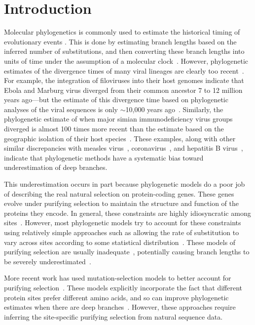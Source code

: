 \documentclass[11pt]{article}
\begin{document}
\section*{Introduction} 
Molecular phylogenetics is commonly used to estimate the historical timing of evolutionary events \citep{yang2012molecular}.
This is done by estimating branch lengths based on the inferred number of substitutions, and then converting these branch lengths into units of time under the assumption of a molecular clock~\citep{zuckerkandl1965,drummond2006relaxed}.
However, phylogenetic estimates of the divergence times of many viral lineages are clearly too recent~\citep{duchene2014analyses, ho2015time, aiewsakun2016time}.
For example, the integration of filoviruses into their host genomes indicate that Ebola and Marburg virus diverged from their common ancestor 7 to 12 million years ago---but the estimate of this divergence time based on phylogenetic analyses of the viral sequences is only $\sim$10,000 years ago~\citep{carroll2013molecular, taylor2014evidence}. 
Similarly, the phylogenetic estimate of when major simian immunodeficiency virus groups diverged is almost 100 times more recent than the estimate based on the geographic isolation of their host species~\citep{wertheim2009dating, worobey2010island}. 
These examples, along with other similar discrepancies with measles virus~\citep{furuse2010origin}, coronavirus~\citep{wertheim2013case}, and hepatitis B virus~\citep{fares2002revised, holmes2003molecular}, indicate that phylogenetic methods have a systematic bias toward underestimation of deep branches.

This underestimation occurs in part because phylogenetic models do a poor job of describing the real natural selection on protein-coding genes. 
These genes evolve under purifying selection to maintain the structure and function of the proteins they encode. 
In general, these constraints are highly idiosyncratic among sites~\citep{echave2016causes}.
However, most phylogenetic models try to account for these constraints using relatively simple approaches such as allowing the rate of substitution to vary across sites according to some statistical distribution~\citep{yang1994maximum,yang2000codon}.
These models of purifying selection are usually inadequate~\citep{duchene2015substitution, duchene2015evaluating}, potentially causing branch lengths to be severely underestimated~\citep{wertheim2011purifying, halpern1998evolutionary}.

More recent work has used mutation-selection models to better account for purifying selection~\citep{halpern1998evolutionary,yang2008mutation,rodrigue2010mutation,tamuri2012estimating,mccandlish2014modeling}.
These models explicitly incorporate the fact that different protein sites prefer different amino acids, and so can improve phylogenetic estimates when there are deep branches~\citep{philippe1998good, lartillot2007suppression, le2008phylogenetic, si2008empirical, wang2008class}.
However, these approaches require inferring the site-specific purifying selection from natural sequence data.
\end{document}
